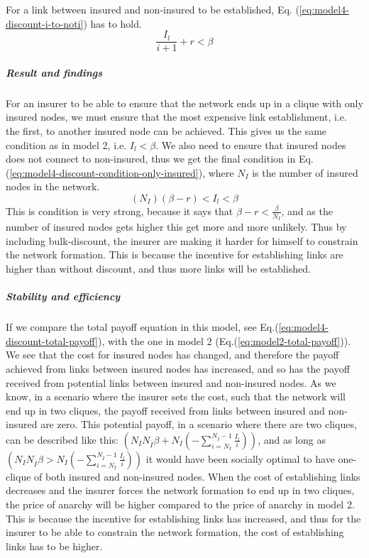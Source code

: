 For a link between insured and non-insured to be established, Eq. (\ref{eq:model4-discount-i-to-noti}) has to hold.
\begin{equation}
\frac{I_{l}}{i+1}+r<\beta
\label{eq:model4-discount-i-to-noti}
\end{equation}
\subparagraph{Result and findings}
For an insurer to be able to ensure that the network ends up in a clique with only insured nodes, we must ensure that the most expensive link establishment, i.e. the first, to another insured node can be achieved. This gives us the same condition as in model 2, i.e. $I_{l}<\beta$. 
We also need to ensure that insured nodes does not connect to non-insured, thus we get the final condition in Eq. (\ref{eq:model4-discount-condition-only-insured}), where $N_{I}$ is the number of insured nodes in the network.
\begin{equation}
(N_{I})(\beta-r)<I_{l}<\beta
\label{eq:model4-discount-condition-only-insured}
\end{equation}
This is condition is very strong, because it says that $\beta-r<\frac{\beta}{N_{I}}$, and as the number of insured nodes gets higher this get more and more unlikely. 
Thus by including bulk-discount, the insurer are making it harder for himself to constrain the network formation. This is because the incentive for establishing links are higher than without discount, and thus more links will be established.
\subparagraph{Stability and efficiency}
If we compare the total payoff equation in this model, see Eq.(\ref{eq:model4-discount-total-payoff}), with the one in model 2 (Eq.(\ref{eq:model2-total-payoff})). We see that the cost for insured nodes has changed, and therefore the payoff achieved from links between insured nodes has increased, and so has the  payoff received from potential links between insured and non-insured nodes. 
As we know, in a scenario where the insurer sets the cost, such that the network will end up in two cliques, the payoff received from links between insured and non-insured are zero. This potential payoff, in a scenario where there are two cliques, can be described like this: $(N_{I}N_{\overline{I}}\beta+N_{I}(-\sum_{i=N_{I}}^{N_{\overline{I}}-1}\frac{I_{l}}{i}))$, and as long as $(N_{I}N_{\overline{I}}\beta>N_{I}(-\sum_{i=N_{I}}^{N_{\overline{I}}-1}\frac{I_{l}}{i}))$ it would have been socially optimal to have one-clique of both insured and non-insured nodes.
When the cost of establishing links decreases and the insurer forces the network formation to end up in two cliques, the price of anarchy will be higher compared to the price of anarchy in model 2. 
This is because the incentive for establishing links has increased, and thus for the insurer to be able to constrain the network formation, the cost of establishing links has to be higher.

